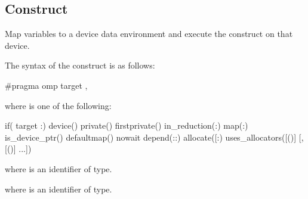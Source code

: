 \subsection{ Construct}
\label{subsec:target Construct}
\summary
Map variables to a device data environment and execute the construct on that device.
\syntax
\begin{ccppspecific}
The syntax of the  construct is as follows:

\begin{ompcPragma}
#pragma omp target \plc{[clause[ [},\plc{] clause] ... ] new-line}
\end{ompcPragma}

where  is one of the following:

\begin{indentedcodelist}
if(\plc{[} target :\plc{] scalar-expression})
device()
private()
firstprivate()
in_reduction(:)
map(\plc{[[map-type-modifier[,]] map-type}:\plc{ ] list})
is_device_ptr()
defaultmap()
nowait
depend(\plc{[depend-modifier}:\plc{]dependence-type }:)
allocate([\plc{[allocator }:\plc{] list})
uses_allocators([()]
	       [,[()] ...])
\end{indentedcodelist}

where  is an identifier of  type.

where  is an identifier of  type.
\end{ccppspecific}

